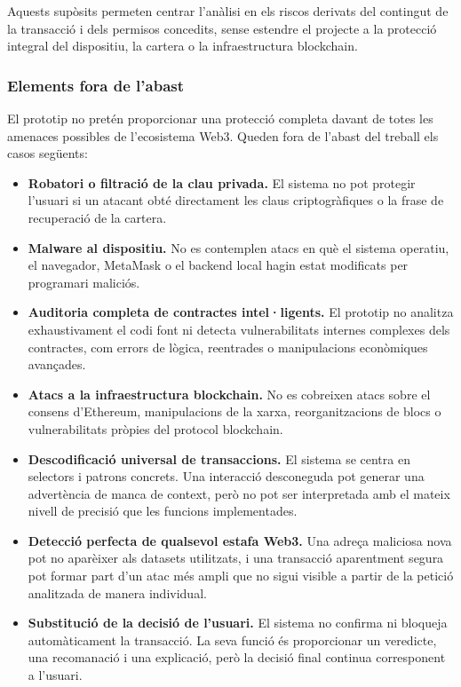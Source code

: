 Aquests supòsits permeten centrar l’anàlisi en els riscos derivats del contingut de la transacció i dels permisos concedits, sense estendre el projecte a la protecció integral del dispositiu, la cartera o la infraestructura blockchain.

\subsubsection{Elements fora de l’abast}

El prototip no pretén proporcionar una protecció completa davant de totes les amenaces possibles de l’ecosistema Web3. Queden fora de l’abast del treball els casos següents:

\begin{itemize}
    \item \textbf{Robatori o filtració de la clau privada.} El sistema no pot protegir l’usuari si un atacant obté directament les claus criptogràfiques o la frase de recuperació de la cartera.

    \item \textbf{Malware al dispositiu.} No es contemplen atacs en què el sistema operatiu, el navegador, MetaMask o el backend local hagin estat modificats per programari maliciós.

    \item \textbf{Auditoria completa de contractes intel·ligents.} El prototip no analitza exhaustivament el codi font ni detecta vulnerabilitats internes complexes dels contractes, com errors de lògica, reentrades o manipulacions econòmiques avançades.

    \item \textbf{Atacs a la infraestructura blockchain.} No es cobreixen atacs sobre el consens d’Ethereum, manipulacions de la xarxa, reorganitzacions de blocs o vulnerabilitats pròpies del protocol blockchain.

    \item \textbf{Descodificació universal de transaccions.} El sistema se centra en selectors i patrons concrets. Una interacció desconeguda pot generar una advertència de manca de context, però no pot ser interpretada amb el mateix nivell de precisió que les funcions implementades.

    \item \textbf{Detecció perfecta de qualsevol estafa Web3.} Una adreça maliciosa nova pot no aparèixer als datasets utilitzats, i una transacció aparentment segura pot formar part d’un atac més ampli que no sigui visible a partir de la petició analitzada de manera individual.

    \item \textbf{Substitució de la decisió de l’usuari.} El sistema no confirma ni bloqueja automàticament la transacció. La seva funció és proporcionar un veredicte, una recomanació i una explicació, però la decisió final continua corresponent a l’usuari.
\end{itemize}

